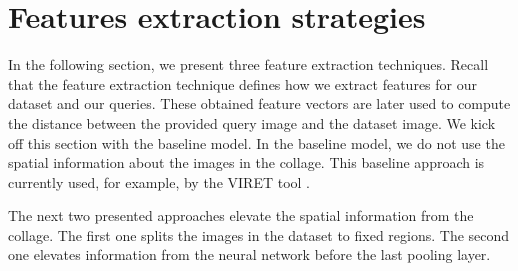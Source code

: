 



\section{Features extraction strategies}

In the following section, we present three feature extraction techniques. Recall that the feature extraction technique defines how we extract features for our dataset and our queries. These obtained feature vectors are later used to compute the distance between the provided query image and the dataset image. We kick off this section with the baseline model. In the baseline model, we do not use the spatial information about the images in the collage. This baseline approach is currently used, for example, by the VIRET tool \citep{kovalvcik2020viret}. 

The next two presented approaches elevate the spatial information from the collage. The first one splits the images in the dataset to fixed regions. The second one elevates information from the neural network before the last pooling layer.

